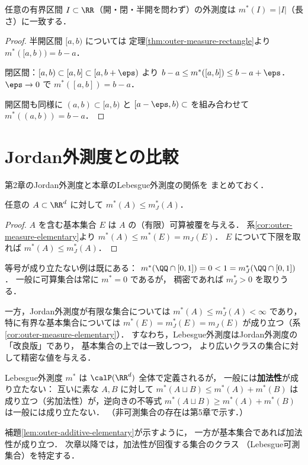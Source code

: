 \begin{example}[区間の外測度]\label{ex:interval-outer}
任意の有界区間 $I \subset \RR$（開・閉・半開を問わず）の外測度は
$m^*(I) = |I|$（長さ）に一致する．
\end{example}
\begin{proof}
半開区間 $[a,b)$ については
定理\ref{thm:outer-measure-rectangle}より
$m^*([a,b)) = b - a$．

閉区間：$[a,b) \subset [a,b] \subset [a,b+\eps)$ より
$b - a \le m^*([a,b]) \le b - a + \eps$．
$\eps \to 0$ で $m^*([a,b]) = b - a$．

開区間も同様に
$(a,b) \subset [a,b)$ と $[a-\eps,b) \subset$ を組み合わせて
$m^*((a,b)) = b - a$．
\end{proof}

\section{Jordan外測度との比較}\label{sec:jordan-lebesgue-outer}

第2章のJordan外測度と本章のLebesgue外測度の関係を
まとめておく．

\begin{theorem}\label{thm:jordan-lebesgue-outer}
任意の $A \subset \RR^d$ に対して $m^*(A) \le m_J^*(A)$．
\end{theorem}
\begin{proof}
$A$ を含む基本集合 $E$ は $A$ の（有限）可算被覆を与える．
系\ref{cor:outer-measure-elementary}より
$m^*(A) \le m^*(E) = m_J(E)$．
$E$ について下限を取れば $m^*(A) \le m_J^*(A)$．
\end{proof}

\begin{example}\label{ex:strict-inequality}
等号が成り立たない例は既にある：
$m^*(\QQ \cap [0,1]) = 0 < 1 = m_J^*(\QQ \cap [0,1])$．
一般に可算集合は常に $m^* = 0$ であるが，
稠密であれば $m_J^* > 0$ を取りうる．
\end{example}

\begin{remark}
一方，Jordan外測度が有限な集合については
$m^*(A) \le m_J^*(A) < \infty$ であり，
特に有界な基本集合については
$m^*(E) = m_J^*(E) = m_J(E)$ が成り立つ（系\ref{cor:outer-measure-elementary}）．
すなわち，Lebesgue外測度はJordan外測度の「改良版」であり，
基本集合の上では一致しつつ，
より広いクラスの集合に対して精密な値を与える．
\end{remark}

\begin{remark}[外測度の限界]\label{rem:outer-limitation}
Lebesgue外測度 $m^*$ は $\calP(\RR^d)$ 全体で定義されるが，
一般には\textbf{加法性}が成り立たない：
互いに素な $A, B$ に対して
$m^*(A \sqcup B) \le m^*(A) + m^*(B)$
は成り立つ（劣加法性）が，逆向きの不等式
$m^*(A \sqcup B) \ge m^*(A) + m^*(B)$
は一般には成り立たない．
（非可測集合の存在は第5章で示す．）

補題\ref{lem:outer-additive-elementary}が示すように，
一方が基本集合であれば加法性が成り立つ．
次章以降では，加法性が回復する集合のクラス
（Lebesgue可測集合）を特定する．
\end{remark}
